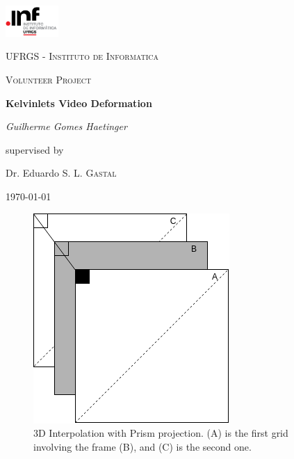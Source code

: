 \documentclass[12pt, a4paper]{report}
\begin{document}
	\begin{titlepage}
		\centering
		\includegraphics[width=0.15\textwidth]{res/inf.png}\par\vspace{1cm}
		{\scshape\LARGE UFRGS - Instituto de Informatica \par}
		\vspace{1cm}
		{\scshape\Large Volunteer Project\par}
		\vspace{1.5cm}
		{\huge\bfseries Kelvinlets Video Deformation\par}
		\vspace{2cm}
		{\Large\itshape Guilherme Gomes Haetinger\par}
		\vfill
		supervised by\par
		Dr. Eduardo S. L. \textsc{Gastal}

		\vfill

		{\large \today\par}
	\end{titlepage}

	\begin{figure}
		\includegraphics[scale=0.5, center]{./res/interpolationExample.png}
		\caption{3D Interpolation with Prism projection. (A) is the first grid involving the frame (B), and (C) is the second one.}
		\label{fig:newInterp}
	\end{figure}
\end{document}
